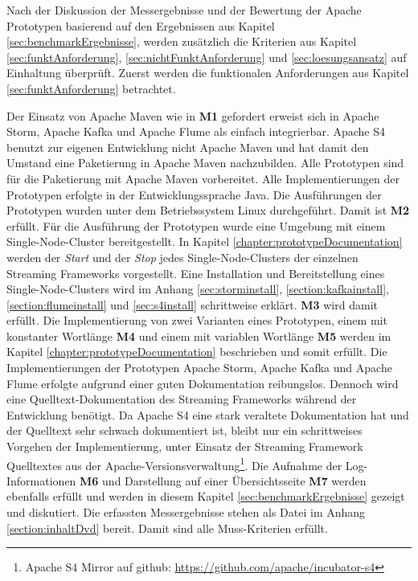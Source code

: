 Nach der Diskussion der Messergebnisse und der Bewertung der Apache Prototypen basierend auf den Ergebnissen aus Kapitel \ref{sec:benchmarkErgebnisse}, werden zusätzlich die Kriterien aus Kapitel \ref{sec:funktAnforderung}, \ref{sec:nichtFunktAnforderung} und \ref{sec:loesungsansatz} auf Einhaltung überprüft. Zuerst werden die funktionalen Anforderungen aus Kapitel \ref{sec:funktAnforderung} betrachtet.

Der Einsatz von Apache Maven wie in \textbf{M1} gefordert erweist sich in Apache Storm, Apache Kafka und Apache Flume als einfach integrierbar. Apache S4 benutzt zur eigenen Entwicklung nicht Apache Maven und hat damit den Umstand eine Paketierung in Apache Maven nachzubilden. Alle Prototypen sind für die Paketierung mit Apache Maven vorbereitet. Alle Implementierungen der Prototypen erfolgte in der Entwicklungssprache Java. Die Ausführungen der Prototypen wurden unter dem Betriebssystem Linux durchgeführt. Damit ist \textbf{M2} erfüllt. Für die Ausführung der Prototypen wurde eine Umgebung mit einem Single-Node-Cluster bereitgestellt. In Kapitel \ref{chapter:prototypeDocumentation} werden der \textit{Start} und der \textit{Stop} jedes Single-Node-Clusters der einzelnen Streaming Frameworks vorgestellt. Eine Installation und Bereitstellung eines Single-Node-Clusters wird im Anhang \ref{sec:storminstall}, \ref{section:kafkainstall}, \ref{section:flumeinstall} und \ref{sec:s4install} schrittweise erklärt. \textbf{M3} wird damit erfüllt. Die Implementierung von zwei Varianten eines Prototypen, einem mit konstanter Wortlänge \textbf{M4} und einem mit variablen Wortlänge \textbf{M5} werden im Kapitel \ref{chapter:prototypeDocumentation} beschrieben und somit erfüllt. Die Implementierungen der Prototypen Apache Storm, Apache Kafka und Apache Flume erfolgte aufgrund einer guten Dokumentation reibungslos. Dennoch wird eine Quelltext-Dokumentation des Streaming Frameworks während der Entwicklung benötigt. Da Apache S4 eine stark veraltete Dokumentation hat und der Quelltext sehr schwach dokumentiert ist, bleibt nur ein schrittweises Vorgehen der Implementierung, unter Einsatz der Streaming Framework Quelltextes aus der Apache-Versionsverwaltung\footnote{Apache S4 Mirror auf github: \url{https://github.com/apache/incubator-s4}}. Die Aufnahme der Log-Informationen \textbf{M6} und Darstellung auf einer Übersichtsseite \textbf{M7} werden ebenfalls erfüllt und werden in diesem Kapitel \ref{sec:benchmarkErgebnisse} gezeigt und diskutiert. Die erfassten Messergebnisse stehen als Datei im Anhang \ref{section:inhaltDvd} bereit. Damit sind alle Muss-Kriterien erfüllt.

